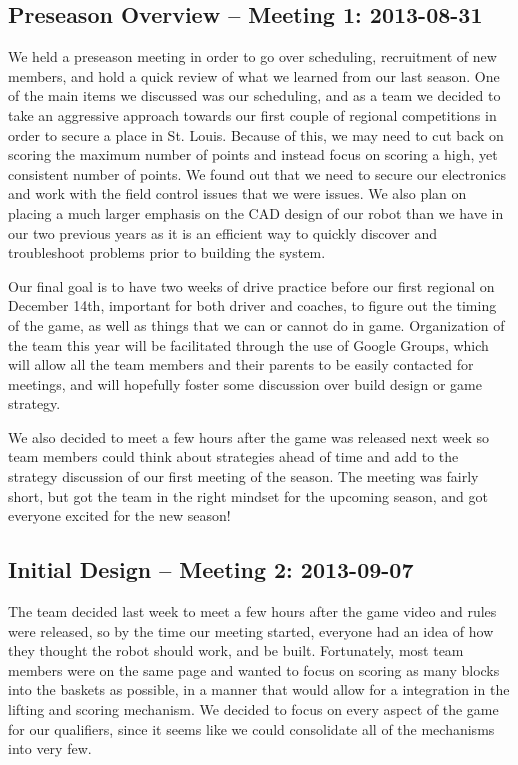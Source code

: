 \documentclass{article}
\begin{document}
\subsection{Preseason Overview -- Meeting 1: 2013-08-31}
We held a preseason meeting in order to go over scheduling, recruitment of new members, and hold a quick review of what we learned from our last season. One of the main items we discussed was our scheduling, and as a team we decided to take an aggressive approach towards our first couple of regional competitions in order to secure a place in St. Louis. Because of this, we may need to cut back on scoring the maximum number of points and instead focus on scoring a high, yet consistent number of points. We found out that we need to secure our electronics and work with the field control issues that we were issues. We also plan on placing a much larger emphasis on the CAD design of our robot than we have in our two previous years as it is an efficient way to quickly discover and troubleshoot problems prior to building the system. 

Our final goal is to have two weeks of drive practice before our first regional on December 14th, important for both driver and coaches, to figure out the timing of the game, as well as things that we can or cannot do in game. Organization of the team this year will be facilitated through the use of Google Groups, which will allow all the team members and their parents to be easily contacted for meetings, and will hopefully foster some discussion over build design or game strategy. 

We also decided to meet a few hours after the game was released next week so team members could think about strategies ahead of time and add to the strategy discussion of our first meeting of the season. The meeting was fairly short, but got the team in the right mindset for the upcoming season, and got everyone excited for the  new season!

\newpage \subsection{Initial Design -- Meeting 2: 2013-09-07}
The team decided last week to meet a few hours after the game video and rules were released, so by the time our meeting started, everyone had an idea of how they thought the robot should work, and be built. Fortunately, most team members were on the same page and wanted to focus on scoring as many blocks into the baskets as possible, in a manner that would allow for a integration in the lifting and scoring mechanism. We decided to focus on every aspect of the game for our qualifiers, since it seems like we could consolidate all of the mechanisms into very few.
\end{document}

